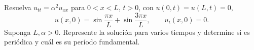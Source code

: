 Resuelva $u_{tt}=\alpha^2u_{xx}$ para $0<x<L$, $t>0$, con $u(0,t)=u(L,t)=0$, \[u(x,0)=\sin\frac{\pi x}{L}+\sin\frac{3\pi x}{L},\qquad u_t(x,0)=0.\] Suponga $L,\alpha>0$. Represente la solución para varios tiempos y determine si es periódica y cuál es su período fundamental.
